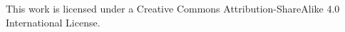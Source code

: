 \documentclass[a4, oneside, 10pt]{memoir}
\begin{document}





\tableofcontents
\thispagestyle{empty}






\pagebreak
\thispagestyle{empty}
\noindent
This work is licensed under a Creative Commons Attribution-ShareAlike 4.0 International License.
\end{document}
